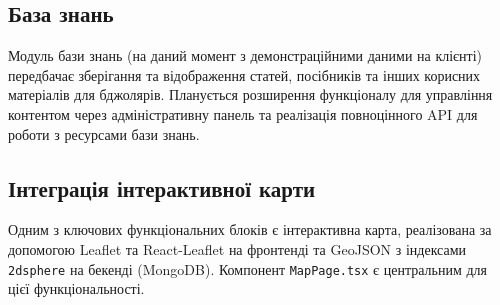 \subsection{База знань}
Модуль бази знань (на даний момент з демонстраційними даними на клієнті) передбачає зберігання та відображення статей, посібників та інших корисних матеріалів для бджолярів. Планується розширення функціоналу для управління контентом через адміністративну панель та реалізація повноцінного API для роботи з ресурсами бази знань.

\subsection{Інтеграція інтерактивної карти}
Одним з ключових функціональних блоків є інтерактивна карта, реалізована за допомогою Leaflet та React-Leaflet на фронтенді та GeoJSON з індексами \texttt{2dsphere} на бекенді (MongoDB). Компонент \texttt{MapPage.tsx} є центральним для цієї функціональності.

